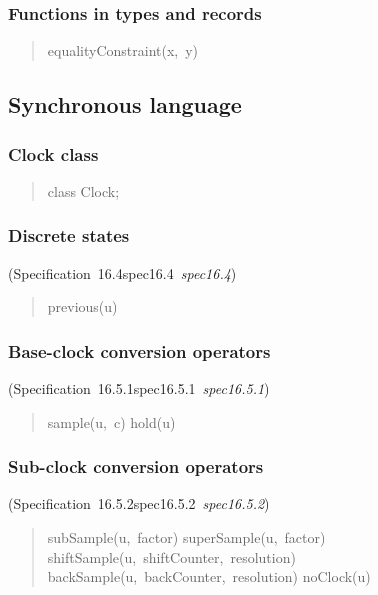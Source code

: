 \documentclass[10pt,b5paper]{article}
\def\specrefx#1#2{Specification~#1\ifx\relax#2\relax{}\else~{\it{}#2}\fi}
\def\specref#1{\specrefx{#1}{\csname spec#1\endcsname}}
\begin{document}
\subsubsection*{Functions in types and records}

\begin{quote}\widespacing

equalityConstraint(x,~y)

\end{quote}


\subsection{Synchronous language}

\subsubsection*{Clock class}

\begin{quote}
class Clock;
\end{quote}

\subsubsection*{Discrete states}
(\specref{16.4}\/)

\begin{quote}\widespacing

previous(u)

\end{quote}

\subsubsection*{Base-clock conversion operators}
(\specref{16.5.1}\/)

\begin{quote}\widespacing

sample(u,~c)
hold(u)

\end{quote}

\subsubsection*{Sub-clock conversion operators}
(\specref{16.5.2}\/)

\begin{quote}\widespacing

subSample(u,~factor)
superSample(u,~factor)
shiftSample(u,~shiftCounter,~resolution)
backSample(u,~backCounter,~resolution)
noClock(u)

\end{quote}
\end{document}
